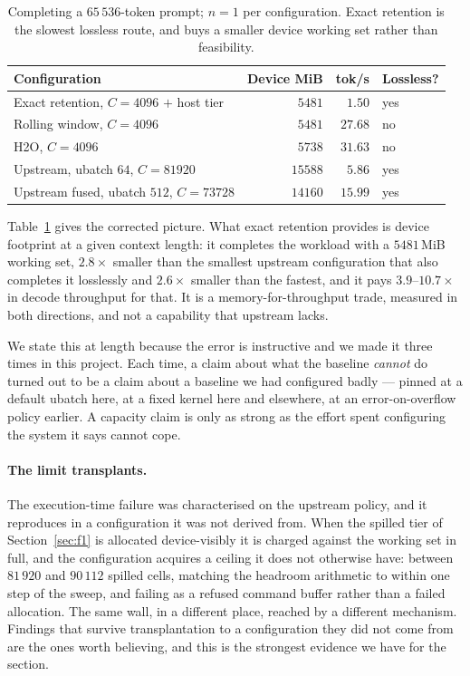 \documentclass[manuscript,anonymous,review]{acmart}
\begin{document}
\begin{table}[t]
  \centering
  \caption{Completing a $65\,536$-token prompt; $n = 1$ per
  configuration. Exact retention is the
  slowest lossless route, and buys a smaller device working set rather
  than feasibility.}
  \label{tab:65k}
  \renewcommand{\arraystretch}{1.25}
  \begin{tabular}{@{}lrrl@{}}
    \toprule
    \textbf{Configuration} & \textbf{Device MiB} & \textbf{tok/s} &
      \textbf{Lossless?} \\
    \midrule
    Exact retention, $C = 4096$ $+$ host tier & $5481$  & $1.50$  & yes \\
    Rolling window, $C = 4096$                & $5481$  & $27.68$ & no  \\
    H2O, $C = 4096$                           & $5738$  & $31.63$ & no  \\
    Upstream, ubatch $64$, $C = 81920$        & $15588$ & $5.86$  & yes \\
    Upstream fused, ubatch $512$, $C = 73728$ & $14160$ & $15.99$ & yes \\
    \bottomrule
  \end{tabular}
\end{table}

Table~\ref{tab:65k} gives the corrected picture. What exact retention
provides is device footprint at a given context length: it completes
the workload with a $5481$\,MiB working set, $2.8\times$ smaller than
the smallest upstream configuration that also completes it losslessly
and $2.6\times$ smaller than the fastest, and it pays $3.9$--$10.7
\times$ in decode throughput for that. It is a memory-for-throughput
trade, measured in both directions, and not a capability that upstream
lacks.

We state this at length because the error is instructive and we made it
three times in this project. Each time, a claim about what the baseline
\emph{cannot} do turned out to be a claim about a baseline we had
configured badly --- pinned at a default ubatch here, at a fixed kernel
here and elsewhere, at an error-on-overflow policy earlier. A capacity
claim is only as strong as the effort spent configuring the system it
says cannot cope.

\paragraph{The limit transplants.} The execution-time failure was
characterised on the upstream policy, and it reproduces in a
configuration it was not derived from. When the spilled tier of
Section~\ref{sec:f1} is allocated device-visibly it is charged against
the working set in full, and the configuration acquires a ceiling it
does not otherwise have: between $81\,920$ and $90\,112$ spilled cells,
matching the headroom arithmetic to within one step of the sweep, and
failing as a refused command buffer rather than a failed allocation.
The same wall, in a different place, reached by a different mechanism.
Findings that survive transplantation to a configuration they did not
come from are the ones worth believing, and this is the strongest
evidence we have for the section.
\end{document}
